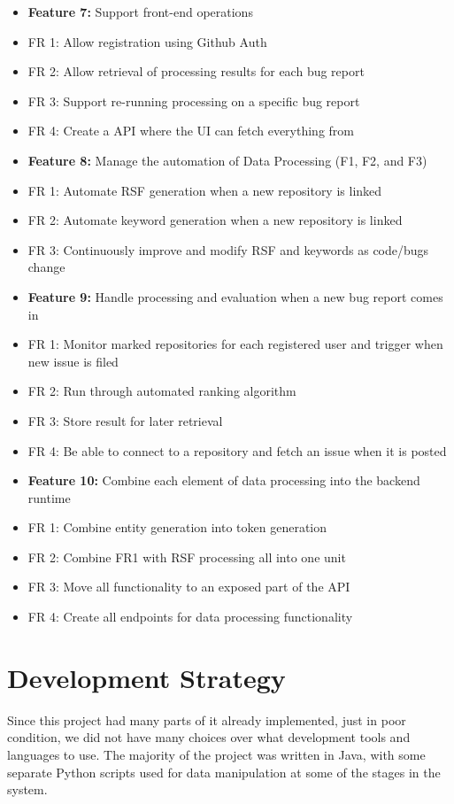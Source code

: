\documentclass[12pt]{article}
\begin{document}
\begin{itemize}
\item
  \textbf{Feature 7:} Support front-end operations
\item
  FR 1: Allow registration using Github Auth
\item
  FR 2: Allow retrieval of processing results for each bug report
\item
  FR 3: Support re-running processing on a specific bug report
\item
  FR 4: Create a API where the UI can fetch everything from
\item
  \textbf{Feature 8:} Manage the automation of Data Processing (F1, F2,
  and F3)
\item
  FR 1: Automate RSF generation when a new repository is linked
\item
  FR 2: Automate keyword generation when a new repository is linked
\item
  FR 3: Continuously improve and modify RSF and keywords as code/bugs
  change
\item
  \textbf{Feature 9:} Handle processing and evaluation when a new bug
  report comes in
\item
  FR 1: Monitor marked repositories for each registered user and trigger
  when new issue is filed
\item
  FR 2: Run through automated ranking algorithm
\item
  FR 3: Store result for later retrieval
\item
  FR 4: Be able to connect to a repository and fetch an issue when it is
  posted
\item
  \textbf{Feature 10:} Combine each element of data processing into the
  backend runtime
\item
  FR 1: Combine entity generation into token generation
\item
  FR 2: Combine FR1 with RSF processing all into one unit
\item
  FR 3: Move all functionality to an exposed part of the API
\item
  FR 4: Create all endpoints for data processing functionality
\end{itemize}

\section{Development Strategy}\label{development-strategy}

Since this project had many parts of it already implemented, just in
poor condition, we did not have many choices over what development tools
and languages to use. The majority of the project was written in Java,
with some separate Python scripts used for data manipulation at some of
the stages in the system.
\end{document}
